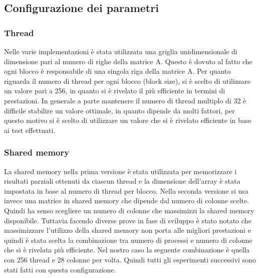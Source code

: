 \documentclass[conference]{IEEEtran}
\begin{document}
\subsection{Configurazione dei parametri}
\subsubsection{Thread}
Nelle varie implementazioni è stata utilizzata una griglia unidimensionale di dimensione pari al numero di righe della matrice A. Questo è dovuto al fatto che ogni blocco è responsabile di una singola riga della matrice A. 
Per quanto riguarda il numero di thread per ogni blocco (block size), si è scelto di utilizzare un valore pari a 256, in quanto si è rivelato il più efficiente in termini di prestazioni. In generale a parte mantenere il numero di thread multiplo di 32 è difficile stabilire un valore ottimale, in quanto dipende da molti fattori, per questo motivo si è scelto di utilizzare un valore che si è rivelato efficiente in base ai test effettuati.
\subsubsection{Shared memory}
La shared memory nella prima versione è stata utilizzata per memorizzare i risultati parziali ottenuti da ciascun thread e la dimensione dell'array è stata impostata in base al numero di thread per blocco. Nella seconda versione si usa invece una matrice in shared memory che dipende dal numero di colonne scelte. Quindi ha senso scegliere un numero di colonne che massimizzi la shared memory disponibile. Tuttavia facendo diverse prove in fase di sviluppo è stato notato che massimizzare l'utilizzo della shared memory non porta alle migliori prestazioni e quindi è stata scelta la combinazione tra numero di processi e numero di colonne che si è rivelata più efficiente. Nel nostro caso la seguente combinazione è quella con 256 thread e 28 colonne per volta. Quindi tutti gli esperimenti successivi sono stati fatti con questa configurazione.
\end{document}
